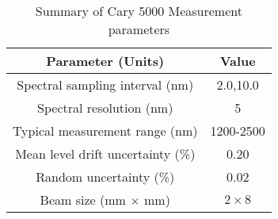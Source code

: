 \begin{table}[h!]
\caption{Summary of Cary 5000 Measurement parameters \label{tabCary5000pars}}
\begin{center}
\begin{tabular}{ c c }
\hline
        Parameter (Units) & Value \\ 
\hline
        Spectral sampling interval (nm) & 2.0,10.0 \\
        Spectral resolution (nm) & 5 \\
        Typical measurement range (nm) & 1200-2500 \\
		Mean level drift uncertainty (\%) & 0.20 \\
		Random uncertainty (\%) & 0.02 \\
 		Beam size (mm $\times$ mm) & $2 \times 8$ \\
    \hline
    \end{tabular}
\end{center}
\end{table}